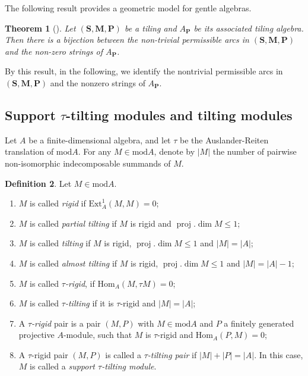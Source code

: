 \documentclass[a4paper,10pt]{amsart}
\theoremstyle{plain}          %
\newtheorem{theorem}{Theorem}[section]
\theoremstyle{definition}
\newtheorem{definition}[theorem]{Definition}
\def\SS{\mathbf{S}}
\def\Pf{\mathbf{P}}
\def\MM{\mathbf{M}}
\def\MM{\mathbf{M}}
\newcommand{\opname}[1]{\operatorname{#1}}
\newcommand{\Ext}{\mathrm{Ext}}
\newcommand{\mmod}{\mathrm{mod}}
\newcommand{\Hom}{\mathrm{Hom}}
\newcommand{\proj}{\opname{proj}}
\begin{document}
 The following result provides a geometric model for gentle algebras.
\begin{theorem}[{\cite[Theorem 3.8]{BS}}]\label{t:permissible arcs and strings} 
 Let $(\SS,\MM,\Pf)$ be a tiling and $A_{\Pf}$ be its associated tiling algebra. Then there is a bijection between the  non-trivial permissible arcs in $(\SS,\MM,\Pf)$ and the non-zero strings of $A_{\Pf}$.
\end{theorem}
By this result, in the following, we identify the  nontrivial permissible arcs in $(\SS,\MM,\Pf)$ and the nonzero strings of $A_{\Pf}$.





\subsection{Support $\tau$-tilting modules and tilting modules}
Let $A$ be a finite-dimensional algebra, and let $\tau$ be the Auslander-Reiten translation of $\text{mod}A$. For any $M\in\text{mod}A$, denote by $|M|$ the number of pairwise non-isomorphic indecomposable summands of $M$.
\begin{definition} Let $M\in\mmod A$.
 \begin{enumerate}
    \item $M$ is called {\it rigid} if $\Ext^1_A(M,M)=0$;
    \item $M$ is called {\it partial tilting} if $M$ is rigid and $\proj.\dim M\le 1$;
    \item $M$ is called {\it tilting} if $M$ is rigid, $\proj.\dim M\le 1$ and $|M|=|A|$;
    \item $M$ is called {\it almost tilting} if $M$ is rigid, $\proj.\dim M\le 1$ and $|M|=|A|-1$;
    \item $M$ is called {\it $\tau$-rigid}, if $\Hom_{A}(M,\tau M)=0$;
    \item $M$ is called {\it $\tau$-tilting} if it is $\tau$-rigid and $|M|=|A|$;
    \item A {\it $\tau$-rigid} pair is a pair $(M,P)$ with $M \in\text{mod}A$ and $P$ a finitely generated projective $A$-module, such that $M$ is $\tau$-rigid and $\Hom_A(P,M) = 0$;
    \item A $\tau$-rigid pair $(M,P)$ is called a {\it $\tau$-tilting pair} if $|M| + |P| = |A|$. In this case, $M$ is called a {\it support $\tau$-tilting module}.
   
\end{enumerate}     
\end{definition}
\end{document}

